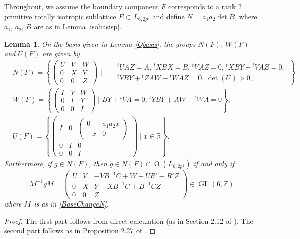 \documentclass[11pt]{amsart}
\newtheorem{lem}[thm]{Lemma}
\newcommand{\RR}{\mathbb{R}}
\newcommand{\ZZ}{\mathbb{Z}}
\newcommand{\opn}{\operatorname}
\begin{document}
Throughout, we assume the boundary component $F$ corresponds to a rank 2 primitive totally isotropic sublattice $E \subset L_{6, 2p^2}$ and define $N=a_1 a_2 \opn{det} B$, where $a_1$, $a_2$, $B$ are as in Lemma \ref{isobasisp}.
\begin{lem}\label{NWU}
On the basis given in Lemma \ref{Qbasis}, the groups $N(F)$, $W(F)$ and $U(F)$ are given by
\begin{align*}
& N(F) = \left \{ 
\begin{pmatrix} 
U & V & W \\ 
0 & X & Y \\ 
0 & 0 & Z 
\end{pmatrix} 
\mid
\begin{matrix} 
&\text{ ${}^t UAZ = A$, ${}^t XBX = B$,  ${}^t VAZ = 0$, ${}^t XBY + {}^t VAZ = 0$, } \\ 
&\text{ ${}^t YBY + {}^t ZAW + {}^t WAZ = 0$, $\opn{det}(U) > 0$},  
\end{matrix} 
\right\} \\
& W(F) = 
\left \{ 
\begin{pmatrix} 
I & V & W \\ 
0 & I & Y \\ 
0 & 0 & I 
\end{pmatrix} 
\mid 
\text{$BY + {}^t VA = 0$, ${}^t Y BY + AW + {}^t WA = 0$} \right \}, \\
& U(F) = \left \{ 
\begin{pmatrix} I & 0 & 
\begin{pmatrix} 0 & a_1a_2x \\ 
- x & 0 
\end{pmatrix} \\ 
0 & I & 0 \\ 
0 & 0 & I 
\end{pmatrix} 
\mid
 x \in \RR \right \}.
\end{align*}
Furthermore, if $g \in N(F)$, then $g \in N(F) \cap \opn{O}(L_{6,2p^2})$ if and only if 
\begin{equation*}
M^{-1} g M 
=
\begin{pmatrix}
U & V & -VB^{-1}C + W + UR' -R'Z \\
0 & X & Y - XB^{-1}C + B^{-1}CZ \\
0 & 0 & Z 
\end{pmatrix} \in \opn{GL}(6, \ZZ)
\end{equation*}
where $M$ is as in \eqref{BaseChangeN}.
\end{lem}
\begin{proof}
The first part follows from direct calculation (as in Section 2.12 of \cite{Kondo}).
The second part follows as in Proposition 2.27 of \cite{GHSK3}.
\end{proof}
\end{document}
